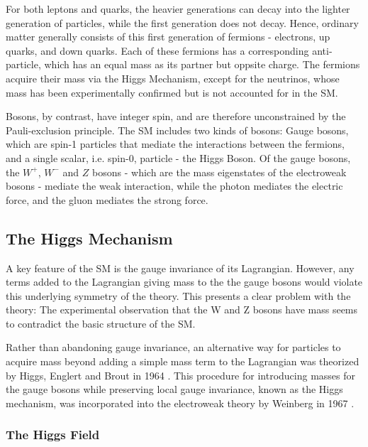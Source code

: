 For both leptons and quarks, the heavier generations can decay into the lighter generation of particles, while the first generation does not decay. Hence, ordinary matter generally consists of this first generation of fermions - electrons, up quarks, and down quarks. Each of these fermions has a corresponding anti-particle, which has an equal mass as its partner but oppsite charge. The fermions acquire their mass via the Higgs Mechanism, except for the neutrinos, whose mass has been experimentally confirmed but is not accounted for in the SM. 

Bosons, by contrast, have integer spin, and are therefore unconstrained by the Pauli-exclusion principle. The SM includes two kinds of bosons: Gauge bosons, which are spin-1 particles that mediate the interactions between the fermions, and a single scalar, i.e. spin-0, particle - the Higgs Boson. Of the gauge bosons, the $W^+$, $W^-$ and $Z$ bosons - which are the mass eigenstates of the electroweak bosons - mediate the weak interaction, while the photon mediates the electric force, and the gluon mediates the strong force. 


\subsection{The Higgs Mechanism}
\label{sec:higgsMech}

A key feature of the SM is the gauge invariance of its Lagrangian. However, any terms added to the Lagrangian giving mass to the the gauge bosons would violate this underlying symmetry of the theory. This presents a clear problem with the theory: The experimental observation that the W and Z bosons have mass seems to contradict the basic structure of the SM. 

Rather than abandoning gauge invariance, an alternative way for particles to acquire mass beyond adding a simple mass term to the Lagrangian was theorized by Higgs, Englert and Brout in 1964 \cite{Higgs}. This procedure for introducing masses for the gauge bosons while preserving local gauge invariance, known as the Higgs mechanism, was incorporated into the electroweak theory by Weinberg in 1967 \cite{PhysRev.127.965}.  

\subsubsection{The Higgs Field}
\label{sec:higgsField}

